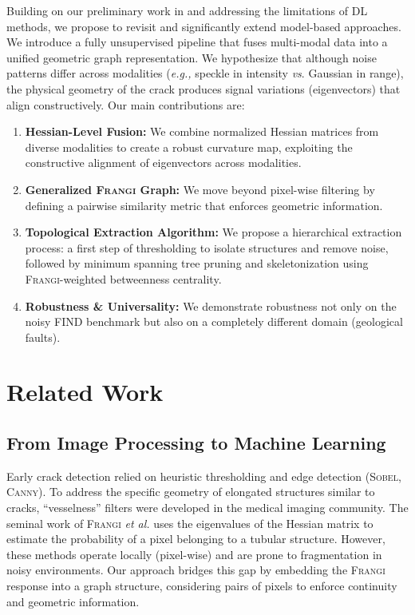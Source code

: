 \documentclass[conference]{IEEEtran}
\newcommand{\eg}[0]{\textit{e.g., }}
\newcommand{\Frangi}[0]{\textsc{Frangi}}
\begin{document}
Building on our preliminary work in \cite{BibiStrasbourg} and addressing %
the limitations of DL methods, we propose to revisit and significantly extend model-based approaches. We introduce a fully unsupervised pipeline that fuses multi-modal data into a unified geometric graph representation. 
We hypothesize that although noise patterns differ across modalities (\eg speckle in intensity \textit{vs}. Gaussian in range), the physical geometry of the crack produces signal variations (eigenvectors) that align constructively. 
Our main contributions are:
\begin{enumerate}
    \item \textbf{Hessian-Level Fusion:} We combine normalized Hessian matrices from diverse modalities to create a robust curvature map, exploiting the constructive alignment of eigenvectors across modalities.
    \item \textbf{Generalized \Frangi{} Graph:} We move beyond pixel-wise filtering by defining a pairwise similarity metric that enforces geometric information.
    \item \textbf{Topological Extraction Algorithm:} We propose a hierarchical extraction process: a first step of thresholding to isolate structures and remove noise, followed by minimum spanning tree pruning and skeletonization using \Frangi{}-weighted betweenness centrality.
    \item \textbf{Robustness \& Universality:} We demonstrate robustness not only on the noisy FIND benchmark \cite{FIND2022} but also on a completely different domain (geological faults).
\end{enumerate}


\section{Related Work}

\subsection{From Image Processing to Machine Learning}
Early crack detection relied on heuristic thresholding and edge detection (\textsc{Sobel}, \textsc{Canny}). To address the specific geometry of elongated structures similar to cracks, ``vesselness'' filters were developed in the medical imaging community. The seminal work of \Frangi{} \textit{et al.} \cite{Frangi1998} uses the eigenvalues of the Hessian matrix to estimate the probability of a pixel belonging to a tubular structure. However, these methods operate locally (pixel-wise) and are prone to fragmentation in noisy environments. Our approach bridges this gap by embedding the \Frangi{} response into a graph structure, considering pairs of pixels to enforce continuity and geometric information.
\end{document}
